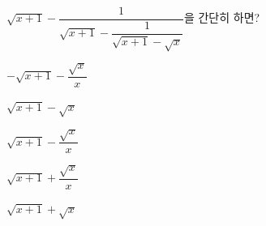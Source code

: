 \hspace*{2mm}\begin{minipage}[t]{\dimexpr\linewidth-2mm\relax}\vspace{0pt}
$\sqrt{x+1}-\dfrac{1}{\sqrt{x+1}-\dfrac{1}{\sqrt{x+1}-\sqrt{x}}}$을 간단히 하면?
\begin{choicesii}{\rule[-3ex]{0pt}{8ex}$-\sqrt{x+1}-\dfrac{\sqrt{x}}{x}$}{\rule[-3ex]{0pt}{8ex}$\sqrt{x+1}-\sqrt{x}$}{\rule[-3ex]{0pt}{8ex}$\sqrt{x+1}-\dfrac{\sqrt{x}}{x}$}{\rule[-3ex]{0pt}{8ex}$\sqrt{x+1}+\dfrac{\sqrt{x}}{x}$}{\rule[-3ex]{0pt}{8ex}$\sqrt{x+1}+\sqrt{x}$}\end{choicesii}\end{minipage}
